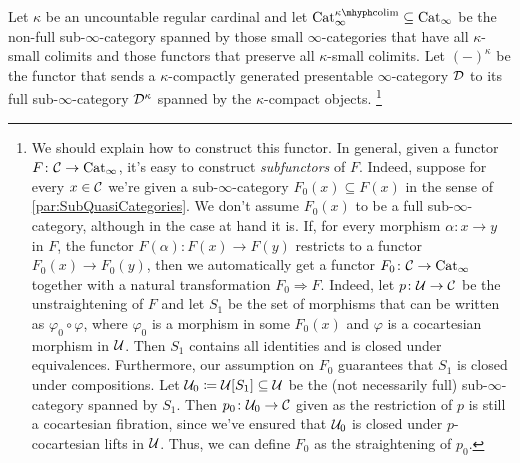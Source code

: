 \begin{lem}\label{lem:PrLKappa}
	Let $\kappa$ be an uncountable regular cardinal and let $\cat{Cat}_\infty^{\kappa\mhyph\!\colimit}\subseteq \cat{Cat}_\infty$ be the non-full sub-$\infty$-category spanned by those small $\infty$-categories that have all $\kappa$-small colimits and those functors that preserve all $\kappa$-small colimits. Let $(-)^\kappa$ be the functor that sends a $\kappa$-compactly generated presentable $\infty$-category $\mathcal{D}$ to its full sub-$\infty$-category $\mathcal{D}^\kappa$ spanned by the $\kappa$-compact objects.%
	\footnote{We should explain how to construct this functor. In general, given a functor $F\colon \mathcal{C}\rightarrow \mathrm{Cat}_\infty$, it's easy to construct \emph{subfunctors} of $F$. Indeed, suppose for every $x\in \mathcal{C}$ we're given a sub-$\infty$-category $F_0(x)\subseteq F(x)$ in the sense of \cref{par:SubQuasiCategories}. We don't assume $F_0(x)$ to be a full sub-$\infty$-category, although in the case at hand it is. If, for every morphism $\alpha\colon x\rightarrow y$ in $F$, the functor $F(\alpha)\colon F(x)\rightarrow F(y)$ restricts to a functor $F_0(x)\rightarrow F_0(y)$, then we automatically get a functor $F_0\colon \mathcal{C}\rightarrow\mathrm{Cat}_\infty$ together with a natural transformation $F_0\Rightarrow F$. Indeed, let $p\colon \mathcal{U}\rightarrow \mathcal{C}$ be the unstraightening of $F$ and let $S_1$ be the set of morphisms that can be written as $\varphi_0\circ \varphi$, where $\varphi_0$ is a morphism in some $F_0(x)$ and $\varphi$ is a cocartesian morphism in $\mathcal{U}$. Then $S_1$ contains all identities and is closed under equivalences. Furthermore, our assumption on $F_0$ guarantees that $S_1$ is closed under compositions. Let $\mathcal{U}_0\coloneqq \mathcal{U}[S_1]\subseteq \mathcal{U}$ be the (not necessarily full) sub-$\infty$-category spanned by $S_1$. Then $p_0\colon \mathcal{U}_0\rightarrow\mathcal{C}$ given as the restriction of $p$ is still a cocartesian fibration, since we've ensured that $\mathcal{U}_0$ is closed under $p$-cocartesian lifts in $\mathcal{U}$. Thus, we can define $F_0$ as the straightening of $p_0$.
		
}
\end{lem}
